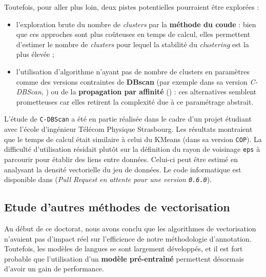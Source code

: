 		Toutefois, pour aller plus loin, deux pistes potentielles pourraient être explorées :
		\begin{itemize}
			\item l'exploration brute du nombre de \textit{clusters} par la \textbf{méthode du coude} : bien que ces approches sont plus coûteuses en temps de calcul, elles permettent d'estimer le nombre de \textit{clusters} pour lequel la stabilité du \textit{clustering} est la plus élevée ;
			\item l'utilisation d'algorithme n'ayant pas de nombre de clusters en paramètres comme des versions contraintes de \textbf{DBscan} (par exemple dans sa version \textit{C-DBScan}, \cite{ruiz-etal:2010:densitybased-semisupervised-clustering}) ou de la \textbf{propagation par affinité} (\cite{givoni-frey:2009:semisupervised-affinity-propagation}) : ces alternatives semblent prometteuses car elles retirent la complexité due à ce paramétrage abstrait.
		\end{itemize}
		
		\begin{leftBarInformation}
			L'étude de \texttt{C-DBScan} a été en partie réalisée dans le cadre d'un projet étudiant avec l'école d'ingénieur Télécom Physique Strasbourg.
			Les résultats montraient que le temps de calcul était similaire à celui du KMeans (dans sa version \texttt{COP}).
			La difficulté d'utilisation résidait plutôt sur la définition du rayon de voisinage \texttt{eps} à parcourir pour établir des liens entre données.
			Celui-ci peut être estimé en analysant la densité vectorielle du jeu de données.
			Le code informatique est disponible dans \cite{schild:2022:cognitivefactory-interactiveclustering} (\textit{\textit{Pull Request} en attente pour une version \texttt{0.6.0}}).
		\end{leftBarInformation}
	
	
	\subsection{Etude d'autres méthodes de vectorisation}
	\label{section:4.7.2-HYPOTHESES-NON-VERIFIEES-VECTORISATION}
	
		Au début de ce doctorat, nous avons conclu que les algorithmes de vectorisation n'avaient pas d'impact réel sur l'efficience de notre méthodologie d'annotation.
		Toutefois, les modèles de langues se sont largement développés, et il est fort probable que l'utilisation d'un \textbf{modèle pré-entraîné} permettent désormais d'avoir un gain de performance.
		
